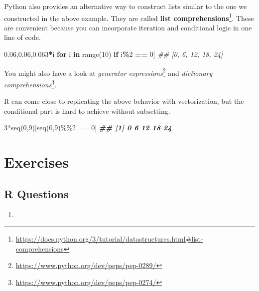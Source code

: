 \documentclass[
  12pt,
  krantz2]{krantz}
\makeatletter
\newenvironment{Shaded}{\begin{snugshade}}{\end{snugshade}}
\newcommand{\BuiltInTok}[1]{#1}
\newcommand{\CommentTok}[1]{\textcolor[rgb]{0.37,0.37,0.37}{\textit{#1}}}
\newcommand{\ControlFlowTok}[1]{\textcolor[rgb]{0.27,0.27,0.27}{\textbf{#1}}}
\newcommand{\DecValTok}[1]{\textcolor[rgb]{0.06,0.06,0.06}{#1}}
\newcommand{\DocumentationTok}[1]{\textcolor[rgb]{0.37,0.37,0.37}{\textbf{\textit{#1}}}}
\newcommand{\FunctionTok}[1]{\textcolor[rgb]{0,0,0}{#1}}
\newcommand{\KeywordTok}[1]{\textcolor[rgb]{0.27,0.27,0.27}{\textbf{#1}}}
\newcommand{\NormalTok}[1]{#1}
\newcommand{\OperatorTok}[1]{\textcolor[rgb]{0.43,0.43,0.43}{\textbf{#1}}}
\newcommand{\SpecialCharTok}[1]{\textcolor[rgb]{0,0,0}{#1}}
\providecommand{\tightlist}{%
  \setlength{\itemsep}{0pt}\setlength{\parskip}{0pt}}
\renewcommand{\href}[2]{#2\footnote{\url{#1}}}
\newenvironment{kframe}{%
\medskip{}
\setlength{\fboxsep}{.8em}
 \def\at@end@of@kframe{}%
 \ifinner\ifhmode%
  \def\at@end@of@kframe{\end{minipage}}%
  \begin{minipage}{\columnwidth}%
 \fi\fi%
 \def\FrameCommand##1{\hskip\@totalleftmargin \hskip-\fboxsep
 \colorbox{shadecolor}{##1}\hskip-\fboxsep
     \hskip-\linewidth \hskip-\@totalleftmargin \hskip\columnwidth}%
 \MakeFramed {\advance\hsize-\width
   \@totalleftmargin\z@ \linewidth\hsize
   \@setminipage}}%
 {\par\unskip\endMakeFramed%
 \at@end@of@kframe}
\renewenvironment{Shaded}{\begin{kframe}}{\end{kframe}}
\makeatother
\begin{document}
Python also provides an alternative way to construct lists similar to the one we constructed in the above example. They are called \href{https://docs.python.org/3/tutorial/datastructures.html\#list-comprehensions}{\textbf{list comprehensions}}. These are convenient because you can incorporate iteration and conditional logic in one line of code.

\begin{Shaded}
\begin{Highlighting}[]
\NormalTok{[}\DecValTok{3}\OperatorTok{*}\NormalTok{i }\ControlFlowTok{for}\NormalTok{ i }\KeywordTok{in} \BuiltInTok{range}\NormalTok{(}\DecValTok{10}\NormalTok{) }\ControlFlowTok{if}\NormalTok{ i}\OperatorTok{\%}\DecValTok{2} \OperatorTok{==} \DecValTok{0}\NormalTok{]}
\CommentTok{\#\# [0, 6, 12, 18, 24]}
\end{Highlighting}
\end{Shaded}

You might also have a look at \href{https://www.python.org/dev/peps/pep-0289/}{\emph{generator expressions}} and \href{https://www.python.org/dev/peps/pep-0274/}{\emph{dictionary comprehensions}}.

R can come close to replicating the above behavior with vectorization, but the conditional part is hard to achieve without subsetting.

\begin{Shaded}
\begin{Highlighting}[]
\DecValTok{3}\SpecialCharTok{*}\FunctionTok{seq}\NormalTok{(}\DecValTok{0}\NormalTok{,}\DecValTok{9}\NormalTok{)[}\FunctionTok{seq}\NormalTok{(}\DecValTok{0}\NormalTok{,}\DecValTok{9}\NormalTok{)}\SpecialCharTok{\%\%}\DecValTok{2} \SpecialCharTok{==} \DecValTok{0}\NormalTok{]}
\DocumentationTok{\#\# [1]  0  6 12 18 24}
\end{Highlighting}
\end{Shaded}

\hypertarget{exercises-9}{%
\section{Exercises}\label{exercises-9}}

\hypertarget{r-questions-8}{%
\subsection{R Questions}\label{r-questions-8}}

\begin{enumerate}
\def\labelenumi{\arabic{enumi}.}
\tightlist
\item
\end{enumerate}
\end{document}
